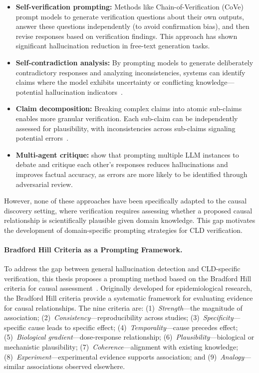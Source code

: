 \begin{itemize}
    \item \textbf{Self-verification prompting:} Methods like Chain-of-Verification (CoVe)~\citep{dhuliawala2024chain} prompt models to generate verification questions about their own outputs, answer these questions independently (to avoid confirmation bias), and then revise responses based on verification findings. This approach has shown significant hallucination reduction in free-text generation tasks.
    
    \item \textbf{Self-contradiction analysis:} By prompting models to generate deliberately contradictory responses and analyzing inconsistencies, systems can identify claims where the model exhibits uncertainty or conflicting knowledge---potential hallucination indicators~\citep{wang2023selfconsistency, huang2025hallucination}.
    
    \item \textbf{Claim decomposition:} Breaking complex claims into atomic sub-claims enables more granular verification. Each sub-claim can be independently assessed for plausibility, with inconsistencies across sub-claims signaling potential errors~\citep{dhuliawala2024chain}.
    
    \item \textbf{Multi-agent critique:} \citet{du2023multiagentdebate} show that prompting multiple LLM instances to debate and critique each other's responses reduces hallucinations and improves factual accuracy, as errors are more likely to be identified through adversarial review.
\end{itemize}

However, none of these approaches have been specifically adapted to the causal discovery setting, where verification requires assessing whether a proposed causal relationship is scientifically plausible given domain knowledge. This gap motivates the development of domain-specific prompting strategies for CLD verification.

\paragraph{Bradford Hill Criteria as a Prompting Framework.}

To address the gap between general hallucination detection and CLD-specific verification, this thesis proposes a prompting method based on the Bradford Hill criteria for causal assessment~\citep{shimonovich2020bradford}. Originally developed for epidemiological research, the Bradford Hill criteria provide a systematic framework for evaluating evidence for causal relationships. The nine criteria are: (1)~\textit{Strength}---the magnitude of association; (2)~\textit{Consistency}---reproducibility across studies; (3)~\textit{Specificity}---specific cause leads to specific effect; (4)~\textit{Temporality}---cause precedes effect; (5)~\textit{Biological gradient}---dose-response relationship; (6)~\textit{Plausibility}---biological or mechanistic plausibility; (7)~\textit{Coherence}---alignment with existing knowledge; (8)~\textit{Experiment}---experimental evidence supports association; and (9)~\textit{Analogy}---similar associations observed elsewhere.

